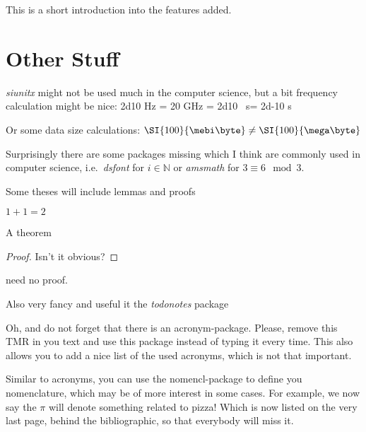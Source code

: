 This is a short introduction into the features added.



\section{Other Stuff}

\emph{siunitx} might not be used much in the computer science, but a bit
frequency calculation might be nice:
\num{2d10} \si{\hertz} = \num{20} \si{\giga\hertz} = \num{2d10}
\si{\per\second}=  \num{2d-10} \si{\second}

Or some data size calculations:
\begin{math}
	\SI{100}{\mebi\byte} \neq \SI{100}{\mega\byte}
\end{math}

Surprisingly there are some packages missing which I think are commonly used in
computer science, i.e.\ \emph{dsfont} for $i \in \mathds{N}$ or \emph{amsmath}
for $3 \equiv 6 \mod{3}$.

\begin{lem} \label{lem:l1}
	Some theses will include lemmas and proofs
\end{lem}
\begin{lem} \label{lem:l2}
	$1 + 1 = 2$
\end{lem}
\begin{thm} \label{thm:t1}
	A theorem
\end{thm}
\begin{proof}
	Isn't it obvious?
\end{proof}
 need no proof.


Also very fancy and useful it the \emph{todonotes} package

Oh, and do not forget that there is an acronym-package.
Please, remove this \ac{TMR} in you text and use this package instead of
	typing it every time.
This also allows you to add a nice list of the used acronyms, which is not
	that important.

Similar to acronyms, you can use the nomencl-package to define you
	nomenclature, which may be of more interest in some cases.
For example, we now say the $\pi$ will denote something related to pizza!
Which is now listed on the very last page, behind the bibliographic, so that
	everybody will miss it.

